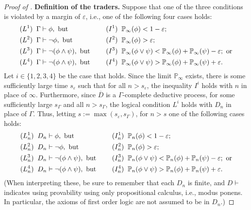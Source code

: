 \documentclass[authordate,onecolumn,noenvironments]{miri-tech-article}
\numberwithin{equation}{subsection}
\newcommand{\seq}[1]{{\overline{#1}}}
\newcommand{\nn}{n}
\newcommand{\tinysection}[1]{\medskip\noindent\textbf{#1.}}
\newcommand{\BelState}{\mathbb{P}}
\newcommand{\pt}{\BelState}
\newcommand{\dt}{D}
\newcommand{\DP}{\seq{\dt}}
\newcommand{\Theory}{\Gamma}
\begin{document}
\begin{proof}[Proof of ]
  \tinysection{Definition of the traders} Suppose that one of the three conditions is violated by a margin of $\varepsilon$, i.e., one of the following four cases holds:
  \begin{alignat*}{2}    
    &(L^1)\;\;\Theory \vdash \phi,  \text{ but } && (I^1)\;\; \pt_\infty(\phi) <  1-\varepsilon;\\
    &(L^2)\;\; \Theory \vdash \lnot \phi, \text{ but } && (I^2)\;\; \pt_\infty(\phi) > \varepsilon;\\
    &(L^3)\;\; \Theory \vdash \lnot(\phi \land \psi),  \text{ but } && (I^3)\;\; \pt_\infty(\phi \lor \psi) < \pt_\infty(\phi) + \pt_\infty(\psi) - \varepsilon;\text{ or}\\
    &(L^4)\;\; \Theory \vdash \lnot(\phi \land \psi), \text{ but \quad } &&(I^4)\;\; \pt_\infty(\phi \lor \psi) > \pt_\infty(\phi) + \pt_\infty(\psi) + \varepsilon.
  \end{alignat*}
  Let $i\in\{1,2,3,4\}$ be the case that holds.  Since the limit $\pt_\infty$ exists, there is some sufficiently large time $s_\varepsilon$ such that for all $n>s_\varepsilon$, the inequality $I^i$ holds with $\nn$ in place of $\infty$.  Furthermore, since $\DP$ is a $\Theory$-complete deductive process, for some sufficiently large $s_\Theory$ and all $n> s_\Theory$, the logical condition $L^i$ holds with $\dt_\nn$ in place of $\Theory$.  Thus, letting $s:= \max( s_\varepsilon, s_\Theory )$, for $n > s$ one of the following cases holds:
  \begin{alignat*}{2}    
    &(L^1_\nn)\;\;\dt_\nn \vdash \phi,  \text{ but } && (I^1_\nn)\;\; \pt_\nn(\phi) <  1-\varepsilon;\\
    &(L^2_\nn)\;\; \dt_\nn \vdash \lnot \phi, \text{ but } && (I^2_\nn)\;\; \pt_\nn(\phi) > \varepsilon;\\
    &(L^3_\nn)\;\; \dt_\nn \vdash \lnot(\phi \land \psi),  \text{ but } && (I^3_\nn)\;\; \pt_\nn(\phi \lor \psi) < \pt_\nn(\phi) + \pt_\nn(\psi) - \varepsilon;\text{ or}\\
    &(L^4_\nn)\;\; \dt_\nn \vdash \lnot(\phi \land \psi), \text{ but \quad } &&(I^4_\nn)\;\; \pt_\nn(\phi \lor \psi) > \pt_\nn(\phi) + \pt_\nn(\psi) + \varepsilon.
  \end{alignat*}
  (When interpreting these, be sure to remember that each $\dt_\nn$ is finite, and $\dt\vdash$ indicates using provability using only propositional calculus, i.e., modus ponens.  In particular, the axioms of first order logic are not assumed to be in $\dt_\nn$.)


\end{proof}
\end{document}

